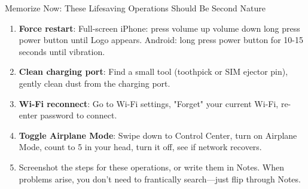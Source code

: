\begin{tcbpractice}{Memorize Now: These Lifesaving Operations Should Be Second Nature}
\begin{enumerate}
  \item \textbf{Force restart}: Full-screen iPhone: press volume up volume down long press power button until Logo appears. Android: long press power button for 10-15 seconds until vibration.
  \item \textbf{Clean charging port}: Find a small tool (toothpick or SIM ejector pin), gently clean dust from the charging port.
  \item \textbf{Wi-Fi reconnect}: Go to Wi-Fi settings, "Forget" your current Wi-Fi, re-enter password to connect.
  \item \textbf{Toggle Airplane Mode}: Swipe down to Control Center, turn on Airplane Mode, count to 5 in your head, turn it off, see if network recovers.
  \item Screenshot the steps for these operations, or write them in Notes. When problems arise, you don't need to frantically search—just flip through Notes.
\end{enumerate}

\end{tcbpractice}
